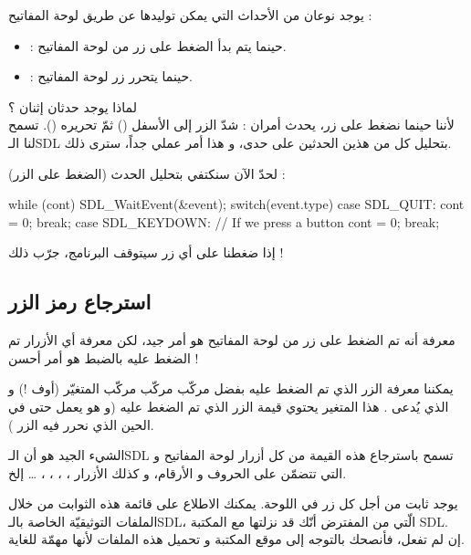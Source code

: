 يوجد نوعان من الأحداث التي يمكن توليدها عن طريق لوحة المفاتيح :

\begin{itemize}
	\item {} :
حينما يتم بدأ الضغط على زر من لوحة المفاتيح.
	\item {} :
حينما يتحرر زر لوحة المفاتيح.
\end{itemize}

لماذا يوجد حدثان إثنان ؟\\
لأننا حينما نضغط على زر، يحدث أمران : شدّ الزر إلى الأسفل
()
ثمّ تحريره 
().
تسمح لنا الـ\textenglish{SDL}
بتحليل كل من هذين الحدثين على حدى، و هذا أمر عملي جداً، سترى ذلك.

لحدّ الآن سنكتفي بتحليل الحدث
(الضغط على الزر) :

\begin{Csource}
while (cont)
{
	SDL_WaitEvent(&event);
	switch(event.type)
	{
		case SDL_QUIT:
		cont = 0;
		break;
		case SDL_KEYDOWN: // If we press a button
		cont = 0;
		break;
	}
}
\end{Csource}

إذا ضغطنا على أي زر سيتوقف البرنامج، جرّب ذلك !

\subsection{استرجاع رمز الزر}

معرفة أنه تم الضغط على زر من لوحة المفاتيح هو أمر جيد، لكن معرفة أي الأزرار تم الضغط عليه بالضبط هو أمر أحسن !

يمكننا معرفة الزر الذي تم الضغط عليه بفضل مركّب مركّب مركّب المتغيّر (أوف !) و الذي يُدعى 
.
 هذا المتغير يحتوي قيمة الزر الذي تم الضغط عليه (و هو يعمل حتى في الحين الذي نحرر فيه الزر
).

\begin{information}
الشيء الجيد هو أن الـ\textenglish{SDL}
تسمح باسترجاع هذه القيمة من كل أزرار لوحة المفاتيح و التي تتضمّن على الحروف و الأرقام، و كذلك الأزرار 
، ، ، ، \dots
إلخ.
\end{information}

يوجد ثابت من أجل كل زر في اللوحة. يمكنك الاطلاع على قائمة هذه الثوابت من خلال الملفات التوثيقيّة الخاصة بالـ\textenglish{SDL}،
الّتي من المفترض أنّك قد نزلتها مع المكتبة 
\textenglish{SDL}.\\
إن لم تفعل، فأنصحك بالتوجه إلى موقع المكتبة و تحميل هذه الملفات لأنها مهمّة للغاية.

